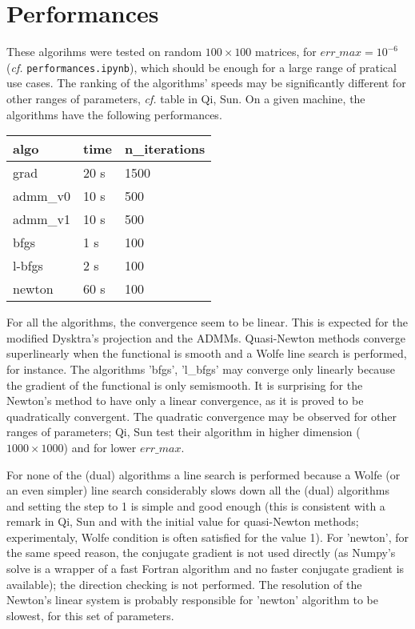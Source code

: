 \documentclass{article}
\begin{document}
\section{Performances}

These algorihms were tested on random $100 \times 100$ matrices, for $err\_max =10^{-6}$ (\emph{cf.} \texttt{performances.ipynb}), which should be enough for a large range of pratical use cases. The ranking of the algorithms' speeds may be significantly different for other ranges of parameters, \emph{cf.} table in Qi, Sun. On a given machine, the algorithms have the following performances.

\medskip

\begin{center}
\begin{tabular}{lll}
 algo     & time  & n\_iterations \\ \hline
 grad     & 20 s  & 1500          \\
 admm\_v0 & 10 s  & 500           \\
 admm\_v1 & 10 s  & 500           \\
 bfgs     & 1 s   & 100           \\
 l-bfgs   & 2 s   & 100           \\
 newton   & 60 s  & 100           \\
\end{tabular}
\end{center}

\medskip

For all the algorithms, the convergence seem to be linear. This is expected for the modified Dysktra's projection and the ADMMs. Quasi-Newton methods converge superlinearly when the functional is smooth and a Wolfe line search is performed, for instance. The algorithms 'bfgs', 'l\_bfgs' may converge only linearly because the gradient of the functional is only semismooth. It is surprising for the Newton's method to have only a linear convergence, as it is proved to be quadratically convergent. The quadratic convergence may be observed for other ranges of parameters; Qi, Sun test their algorithm in higher dimension ($1000 \times 1000$) and for lower $err\_max$. 

\medskip

For none of the (dual) algorithms a line search is performed because a Wolfe (or an even simpler) line search considerably slows down all the (dual) algorithms and setting the step to 1 is simple and good enough (this is consistent with a remark in Qi, Sun and with the initial value for quasi-Newton methods; experimentaly, Wolfe condition is often satisfied for the value 1). For 'newton', for the same speed reason, the conjugate gradient is not used directly (as Numpy's solve is a wrapper of a fast Fortran algorithm and no faster conjugate gradient is available); the direction checking is not performed. The resolution of the Newton's linear system is probably responsible for 'newton' algorithm to be slowest, for this set of parameters.
\end{document}

